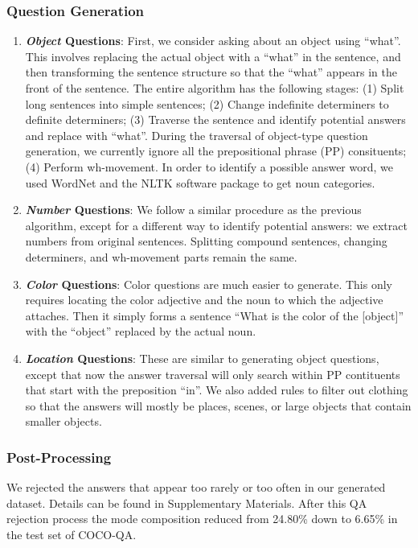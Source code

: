 \documentclass{article} %
\renewcommand{\#}[1]{\textbf{#1}}
\begin{document}
\subsubsection{Question Generation}
\begin{enumerate}[leftmargin=*]
\item \textbf{{\it Object} Questions}:
First, we consider asking about an object using ``what''. This involves 
replacing the actual object with a ``what'' in the sentence, and then 
transforming the sentence structure so that the ``what'' appears in the 
front of the sentence. The entire algorithm has the following stages: (1)
Split long sentences into simple sentences; (2) Change indefinite determiners 
to definite determiners; (3) Traverse the sentence and identify potential answers and replace 
with ``what''. During the traversal of object-type question generation, 
we currently ignore all the prepositional phrase (PP) consituents;
(4) Perform wh-movement.
In order to identify a possible answer word, we used WordNet \cite{wordnet}
and the NLTK software package \cite{nltk} to get noun categories.

\item \textbf{{\it Number} Questions}:
We follow a similar procedure as the 
previous algorithm, except for a different way to identify potential answers:
we extract numbers from original sentences. Splitting 
compound sentences, changing determiners, and wh-movement parts remain the same.

\item \textbf{{\it Color} Questions}:
Color questions are much easier to generate. This only requires locating the 
color adjective and the noun to which the adjective attaches. Then it simply 
forms a sentence ``What is the color of the [object]'' with the ``object'' 
replaced by the actual noun.

\item \textbf{{\it Location} Questions}:
These are similar to generating object questions, except that now the answer
traversal will only search within PP contituents that start with the 
preposition ``in''. We also added rules to filter out clothing so that the 
answers will mostly be places, scenes, or large objects that contain 
smaller objects.
\end{enumerate}

\subsubsection{Post-Processing}
We rejected 
the answers that appear too rarely or too often in our generated
dataset. Details can be found in Supplementary Materials. After
this QA rejection process the mode composition reduced from 24.80\% 
down to 6.65\% in the test set of COCO-QA. 
\end{document}
